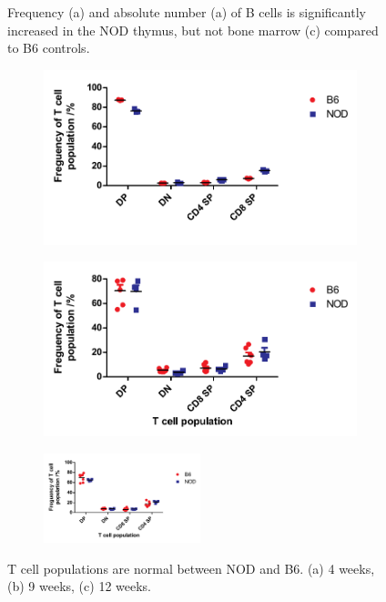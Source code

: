 \begin{figure}
\begin{subfigure}{0.5\textwidth}
	\caption{}
	\label{subfig:BMBcells}
	\end{subfigure}
\caption[NOD thymi have significantly more B cells than B6 thymi]{Frequency (a) and absolute number (a) of B cells is significantly increased in the NOD thymus, but not bone marrow (c) compared to B6 controls.}
\label{fig:IncthyBcells}
\end{figure}

\begin{figure}
	\begin{subfigure}{0.5\textwidth}
	\includegraphics[width=\textwidth]{Figures/4wkThyTcells.pdf}
	\caption{}
	\label{subfig:4wkThyTcells}
	\end{subfigure}
	\begin{subfigure}{0.5\textwidth}
 	\includegraphics[width=\textwidth]{Figures/9wkThyTcells.pdf}
	\caption{}
	\label{subfig:9wkThyTcells}
	\end{subfigure}
	\begin{subfigure}{\textwidth}
	\centering
 	\includegraphics[width=0.5\textwidth]{Figures/12wkThyTcells.pdf}
	\caption{}
	\label{subfig:12wkThyTcells}
	\end{subfigure}
\caption[T cell development is normal in the NOD mouse]{T cell populations are normal between NOD and B6. (a) 4 weeks, (b) 9 weeks, (c) 12 weeks.}
\label{fig:NODB6Tcells}
\end{figure}

